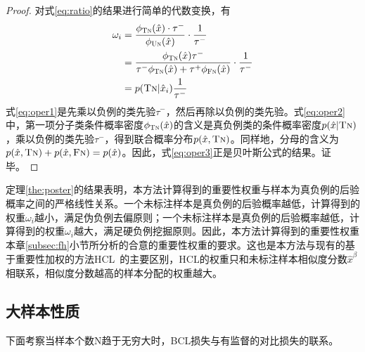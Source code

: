 \begin{theorem}[后验概率估计]
\begin{proof}
对式\ref{eq:ratio}的结果进行简单的代数变换，有
\begin{align}
\omega_i &= \frac{\phi_\textsc{Tn}(\hat{x})\cdot \tau^-}{\phi_\textsc{Un}(\hat{x})} \cdot \frac{1}{\tau^-} \label{eq:oper1}\\
&=\frac{\phi_\textsc{Tn}(\hat{x}) \tau^-}{\tau^-\phi_{\textsc{Tn}}(\hat{x})  +\tau^+\phi_{\textsc{Fn}}(\hat{x})} \cdot \frac{1}{\tau^-}\label{eq:oper2}\\
&= p(\textsc{Tn}|\hat{x}_i) \frac{1}{\tau^-} \label{eq:oper3}
\end{align}
式\eqref{eq:oper1}是先乘以负例的类先验$\tau^-$，然后再除以负例的类先验。式\eqref{eq:oper2}中，第一项分子类条件概率密度$\phi_\textsc{Tn}(\hat{x})$的含义是真负例类的条件概率密度$p(\hat{x}|\textsc{Tn})$，乘以负例的类先验$\tau^-$，得到联合概率分布$p(\hat{x},\textsc{Tn})$。同样地，分母的含义为$p(\hat{x},\textsc{Tn})+p(\hat{x},\textsc{Fn})=p(\hat{x})$。因此，式\eqref{eq:oper3}正是贝叶斯公式的结果。证毕。
\end{proof}
\end{theorem}
定理\ref{the:poster}的结果表明，本方法计算得到的重要性权重与样本为真负例的后验概率之间的严格线性关系。一个未标注样本是真负例的后验概率越低，计算得到的权重$\omega_i$越小，满足伪负例去偏原则；一个未标注样本是真负例的后验概率越低，计算得到的权重$\omega_i$越大，满足硬负例挖掘原则。因此，本方法计算得到的重要性权重本章\ref{subsec:fh}小节所分析的合意的重要性权重的要求。这也是本方法与现有的基于重要性加权的方法HCL~\cite{Robinson:2021:ICLR}的主要区别，HCL的权重只和未标注样本相似度分数$\hat{x}^\beta$相联系，相似度分数越高的样本分配的权重越大。

\subsection{大样本性质}
下面考察当样本个数N趋于无穷大时，BCL损失与有监督的对比损失的联系。

